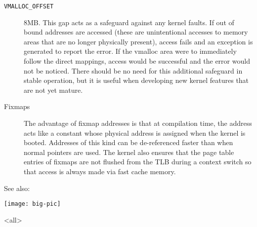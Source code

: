 \begin{description}
\item[\texttt{VMALLOC\_OFFSET}] 8MB. This gap acts as a safeguard against any kernel
  faults. If out of bound addresses are accessed (these are unintentional accesses to
  memory areas that are no longer physically present), access fails and an exception is
  generated to report the error. If the vmalloc area were to immediately follow the direct
  mappings, access would be successful and the error would not be noticed. There should be
  no need for this additional safeguard in stable operation, but it is useful when
  developing new kernel features that are not yet mature. 
\item[Fixmaps] The advantage of fixmap addresses is that at compilation
  time, the address acts like a constant whose physical address is assigned when the
  kernel is booted. Addresses of this kind can be de-referenced faster than when normal
  pointers are used. The kernel also ensures that the page table entries of fixmaps are
  not flushed from the TLB during a context switch so that access is always made via fast
  cache memory. 
\end{description}

See also: 



\begin{center}
  \texttt{[image: big-pic]}
\end{center}

\mode<all>
